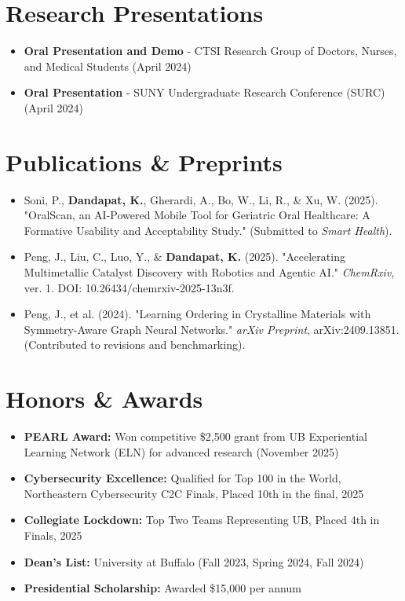 \documentclass[11pt,a4paper]{article}
\begin{document}
\section*{Research Presentations}
\noindent
\begin{itemize}[nosep]
    \item \textbf{Oral Presentation and Demo} - CTSI Research Group of Doctors, Nurses, and Medical Students (April 2024)
    \item \textbf{Oral Presentation} - SUNY Undergraduate Research Conference (SURC) (April 2024)
\end{itemize}

\section*{Publications \& Preprints}
\begin{itemize}[nosep]
    \item Soni, P., \textbf{Dandapat, K.}, Gherardi, A., Bo, W., Li, R., \& Xu, W. (2025). "OralScan, an AI-Powered Mobile Tool for Geriatric Oral Healthcare: A Formative Usability and Acceptability Study." (Submitted to \textit{Smart Health}).
    \item Peng, J., Liu, C., Luo, Y., \& \textbf{Dandapat, K.} (2025). "Accelerating Multimetallic Catalyst Discovery with Robotics and Agentic AI." \textit{ChemRxiv}, ver. 1. DOI: 10.26434/chemrxiv-2025-13n3f.
    \item Peng, J., et al. (2024). "Learning Ordering in Crystalline Materials with Symmetry-Aware Graph Neural Networks." \textit{arXiv Preprint}, arXiv:2409.13851. (Contributed to revisions and benchmarking).
\end{itemize}

\section*{Honors \& Awards}
\noindent
\begin{itemize}[nosep]
    \item \textbf{PEARL Award:} Won competitive \$2,500 grant from UB Experiential Learning Network (ELN) for advanced research (November 2025)
    \item \textbf{Cybersecurity Excellence:} Qualified for Top 100 in the World, Northeastern Cybersecurity C2C Finals, Placed 10th in the final, 2025
    \item \textbf{Collegiate Lockdown:} Top Two Teams Representing UB, Placed 4th in Finals, 2025
    \item \textbf{Dean's List:} University at Buffalo (Fall 2023, Spring 2024, Fall 2024)
    \item \textbf{Presidential Scholarship:} Awarded \$15,000 per annum
\end{itemize}
\end{document}
